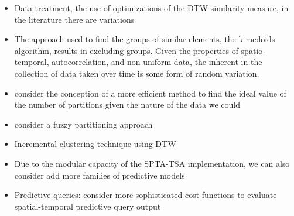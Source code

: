\begin{itemize}

    \item Data treatment, the use of optimizations of the DTW similarity measure, in the literature there are variations
    \item The approach used to find the groups of similar elements, the k-medoids algorithm, results in excluding groups. Given the properties of spatio-temporal, autocorrelation, and non-uniform data, the inherent in the collection of data taken over time is some form of random variation.
    \item consider the conception of a more efficient method to find the ideal value of the number of partitions given the nature of the data we could
    \item consider a fuzzy partitioning approach
    
    \item Incremental clustering technique using DTW

    \item Due to the modular capacity of the SPTA-TSA implementation, we can also consider add more families of predictive models 

    \item Predictive queries: consider more sophisticated cost functions to evaluate spatial-temporal predictive query output
\end{itemize}

